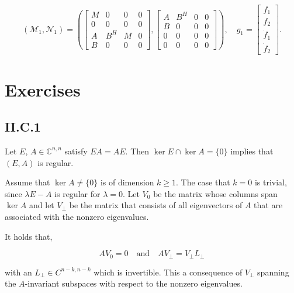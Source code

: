 \documentclass[]{book}
\theoremstyle{definition}
\theoremstyle{definition}
\theoremstyle{definition}
\theoremstyle{definition}
\theoremstyle{remark}
\begin{document}
\begin{equation}
\left ( \mathcal M_1 , \mathcal N_1 \right )
=
\left (
\begin{bmatrix} 
M & 0 & 0 & 0\\
0 & 0 & 0 & 0\\
A & B^H & M & 0\\
B & 0 & 0 & 0
\end{bmatrix}
,
\begin{bmatrix} 
A & B^H& 0 & 0\\
B & 0 & 0 & 0\\
0 & 0 & 0 & 0\\
0 & 0 & 0 & 0
\end{bmatrix}
\right )
,
\quad
g_1 =
\begin{bmatrix}
f_1 \\ f_2 \\ \dot f_1 \\ \dot f_2
\end{bmatrix}.
\end{equation}

\newcommand{\spann}{\operatorname{span}}

\hypertarget{exercises}{%
\chapter{Exercises}\label{exercises}}

\hypertarget{ii.c.1}{%
\section{II.C.1}\label{ii.c.1}}

Let \(E\), \(A \in \mathbb C^{n,n}\) satisfy \(EA=AE\). Then \(\ker E \cap \ker A = \{0\}\) implies that \((E, A)\) is regular.

Assume that \(\ker A \neq \{0\}\) is of dimension \(k\geq 1\). The case that \(k=0\) is trivial, since \(\lambda E - A\) is regular for \(\lambda = 0\). Let \(V_0\) be the matrix whose columns span \(\ker A\) and let \(V_\perp\) be the matrix that consists of all eigenvectors of \(A\) that are associated with the nonzero eigenvalues.

It holds that,

\[AV_0 = 0 \quad \text{and} \quad AV_\perp = V_\perp L_\perp\]

with an \(L_\perp \in C^{n-k,n-k}\) which is invertible. This a consequence of \(V_\perp\) spanning the \(A\)-invariant subspaces with respect to the nonzero eigenvalues.
\end{document}
